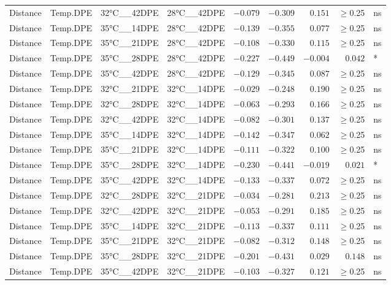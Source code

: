 \documentclass[
]{article}
\begin{document}
\begin{longtable}{llllrrrrl}
Distance & Temp.DPE & 32°C\_\_42DPE & 28°C\_\_42DPE & $-0.079$ & $-0.309$ & $0.151$ & $\geq$0.25 & ns \\ 
Distance & Temp.DPE & 35°C\_\_14DPE & 28°C\_\_42DPE & $-0.139$ & $-0.355$ & $0.077$ & $\geq$0.25 & ns \\ 
Distance & Temp.DPE & 35°C\_\_21DPE & 28°C\_\_42DPE & $-0.108$ & $-0.330$ & $0.115$ & $\geq$0.25 & ns \\ 
Distance & Temp.DPE & 35°C\_\_28DPE & 28°C\_\_42DPE & $-0.227$ & $-0.449$ & $-0.004$ & $0.042$ & * \\ 
Distance & Temp.DPE & 35°C\_\_42DPE & 28°C\_\_42DPE & $-0.129$ & $-0.345$ & $0.087$ & $\geq$0.25 & ns \\ 
Distance & Temp.DPE & 32°C\_\_21DPE & 32°C\_\_14DPE & $-0.029$ & $-0.248$ & $0.190$ & $\geq$0.25 & ns \\ 
Distance & Temp.DPE & 32°C\_\_28DPE & 32°C\_\_14DPE & $-0.063$ & $-0.293$ & $0.166$ & $\geq$0.25 & ns \\ 
Distance & Temp.DPE & 32°C\_\_42DPE & 32°C\_\_14DPE & $-0.082$ & $-0.301$ & $0.137$ & $\geq$0.25 & ns \\ 
Distance & Temp.DPE & 35°C\_\_14DPE & 32°C\_\_14DPE & $-0.142$ & $-0.347$ & $0.062$ & $\geq$0.25 & ns \\ 
Distance & Temp.DPE & 35°C\_\_21DPE & 32°C\_\_14DPE & $-0.111$ & $-0.322$ & $0.100$ & $\geq$0.25 & ns \\ 
Distance & Temp.DPE & 35°C\_\_28DPE & 32°C\_\_14DPE & $-0.230$ & $-0.441$ & $-0.019$ & $0.021$ & * \\ 
Distance & Temp.DPE & 35°C\_\_42DPE & 32°C\_\_14DPE & $-0.133$ & $-0.337$ & $0.072$ & $\geq$0.25 & ns \\ 
Distance & Temp.DPE & 32°C\_\_28DPE & 32°C\_\_21DPE & $-0.034$ & $-0.281$ & $0.213$ & $\geq$0.25 & ns \\ 
Distance & Temp.DPE & 32°C\_\_42DPE & 32°C\_\_21DPE & $-0.053$ & $-0.291$ & $0.185$ & $\geq$0.25 & ns \\ 
Distance & Temp.DPE & 35°C\_\_14DPE & 32°C\_\_21DPE & $-0.113$ & $-0.337$ & $0.111$ & $\geq$0.25 & ns \\ 
Distance & Temp.DPE & 35°C\_\_21DPE & 32°C\_\_21DPE & $-0.082$ & $-0.312$ & $0.148$ & $\geq$0.25 & ns \\ 
Distance & Temp.DPE & 35°C\_\_28DPE & 32°C\_\_21DPE & $-0.201$ & $-0.431$ & $0.029$ & $0.148$ & ns \\ 
Distance & Temp.DPE & 35°C\_\_42DPE & 32°C\_\_21DPE & $-0.103$ & $-0.327$ & $0.121$ & $\geq$0.25 & ns \\ 

\end{longtable}
\end{document}
